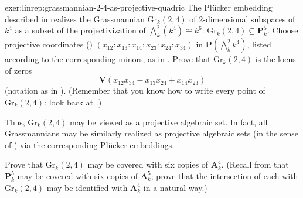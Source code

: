 \begin{exer}{}{exer:linrep:grassmannian-2-4-as-projective-quadric}
  The Pl\"ucker embedding described in
   realizes
  the Grassmannian $\mathrm{Gr}_k(2,4)$ of $2$-dimensional subspaces
  of $k^4$ as a subset of the projectivization of
  $\bigwedge^2_k(k^4) \cong k^6$:
  $\mathrm{Gr}_k(2,4) \subseteq \mathbf{P}^5_k$. Choose projective
  coordinates ()
  $(x_{12} : x_{13} : x_{14} : x_{23} : x_{24} : x_{34})$ in
  $\mathbf{P}(\bigwedge^2_k k^4)$, listed according to the
  corresponding minors, as in . Prove that
  $\mathrm{Gr}_k(2,4)$ is the locus of zeros
  \[
    \mathbf{V}(x_{12}x_{34} - x_{13}x_{24} + x_{14}x_{23})
  \]
  (notation as in
  ). (Remember
  that you know how to write every point of $\mathrm{Gr}_k(2,4)$: look
  back at .)

  Thus, $\mathrm{Gr}_k(2,4)$ may be viewed as a projective algebraic
  set. In fact, all Grassmannians may be similarly realized as
  projective algebraic sets (in the sense of
  )
  via the corresponding Pl\"ucker embeddings.

  Prove that $\mathrm{Gr}_k(2,4)$ may be covered with six copies of
  $\mathbf{A}^4_k$. (Recall from
   that
  $\mathbf{P}^5_k$ may be covered with six copies of $\mathbf{A}^5_k$;
  prove that the intersection of each with $\mathrm{Gr}_k(2,4)$ may be
  identified with $\mathbf{A}^4_k$ in a natural way.)
\end{exer}

